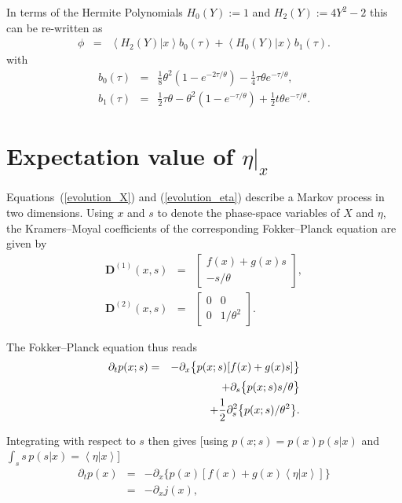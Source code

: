 \documentclass[aps,twocolumn,superscriptaddress,showpacs,showkeys]{revtex4}
\newcommand{\p}{\partial}
\newcommand{\vecDDrift}{\mathbf{D}^{(1)}}
\newcommand{\vecDDiff}{\mathbf{D}^{(2)}}
\newcommand{\e}[1]{{ e^{#1/\theta} }}
\begin{document}
{\noindent In terms of the Hermite Polynomials $H_0(Y):=1$ and $H_2(Y):=4Y^2-2$ this can be re-written as
%
\begin{eqnarray}
\phi &=& \left<H_2(Y)|x\right> b_0(\tau) + \left<H_0(Y)|x\right> b_1(\tau).
\end{eqnarray}
\noindent with
%
\begin{subequations}
\begin{eqnarray}
b_0(\tau) &=& \frac{1}{8}\theta^2 (1-\e{-2\tau}) -\frac{1}{4}\tau\theta \e{-\tau},\\
b_1(\tau) &=& \frac{1}{2}\tau\theta  -\theta^2 (1-\e{-\tau})+\frac{1}{2}t\theta \e{-\tau}.
\end{eqnarray}
\end{subequations}


\section{Expectation value of $\eta\big|_x$}
\label{app_expectation_eta0}

\noindent Equations~(\ref{evolution_X}) and (\ref{evolution_eta}) describe a Markov process in two
dimensions. Using $x$ and $s$ to denote the phase-space variables of $X$ and $\eta$, the Kramers--Moyal coefficients of
the corresponding Fokker--Planck equation are given by
%
\begin{eqnarray}
\vecDDrift(x,s) &=& \begin{bmatrix} f(x)+g(x)s \\ -s/\theta\end{bmatrix},\\
\vecDDiff(x,s)  &=& \begin{bmatrix} 0 & 0 \\ 0 & 1/\theta^2\end{bmatrix}.
\end{eqnarray}

\noindent The Fokker--Planck equation thus reads
%
\begin{eqnarray}
\p_t p(x;s) &=& -\p_x\big\{p(x;s)[f(x)+g(x)s]\big\}\nonumber\\[.2em]
               &&+\p_s\big\{p(x;s)s/\theta\big\}\cr
               &&+\frac{1}{2}\p_s^2\big\{p(x;s)/\theta^2\big\}.
\end{eqnarray}

\noindent Integrating with respect to $s$ then gives [using $p(x;s)\!=\!p(x)p(s|x)$
and $\int_s\!s\, p(s|x)\!=\!\left<\eta|x\right>$]
%
\begin{eqnarray}
\p_t p(x) &=& -\p_x\big\{ p(x)[ f(x)+g(x)\left<\eta|x\right>] \big\}\nonumber\\[.2em]
          &=& -\p_x j(x),
\end{eqnarray}

}
\end{document}
